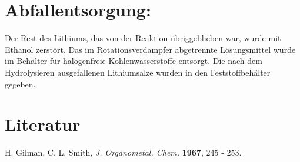 \documentclass[12pt]{article}
\begin{document}
\begin{onehalfspace}
\section{Abfallentsorgung:}
Der Rest des Lithiums, das von der Reaktion übriggeblieben war, wurde mit Ethanol zerstört. 
Das im Rotationsverdampfer abgetrennte Lösungsmittel wurde im Behälter für halogenfreie Kohlenwasserstoffe entsorgt.
Die nach dem Hydrolysieren ausgefallenen Lithiumsalze wurden in den Feststoffbehälter gegeben.

\section{Literatur}
\renewcommand{\section}[2]{}%
\begin{thebibliography}{}
H. Gilman, C. L. Smith, \textit{J. Organometal. Chem.} \textbf{1967}, 245 - 253.
\end{thebibliography}
\end{onehalfspace}
\end{document}
